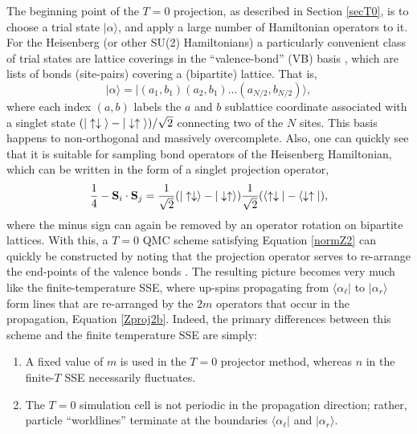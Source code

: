 \documentclass[vecphys]{svmult}
\begin{document}
The beginning point of the $T=0$ projection, as described in Section \ref{secT0}, is to choose a trial state $| \alpha \rangle$, and apply a large number of Hamiltonian operators to it.  
For the Heisenberg (or other SU(2) Hamiltonians) a particularly convenient class of trial states are lattice coverings in the ``valence-bond'' (VB) basis \cite{Melko:Liang88,Melko:Sandvik05,Melko:Beach06,Melko:AWSBeach}, which are lists of bonds (site-pairs) covering a (bipartite) lattice.  That is, 
\begin{equation}
| \alpha \rangle = | (a_1,b_1)(a_2,b_1) \ldots (a_{N/2}, b_{N/2})  \rangle,
\end{equation}
where each index $(a,b)$ labels the $a$ and $b$ sublattice coordinate associated with a singlet state $(|\uparrow \downarrow \hspace{1mm} \rangle  - | \downarrow \uparrow \hspace{1mm} \rangle)/\sqrt{2}$ connecting two of the $N$ sites.  This basis happens to non-orthogonal and massively overcomplete.  Also, one can quickly see that it is suitable for sampling bond operators of the Heisenberg Hamiltonian, which can be written in the form of a singlet projection operator,
\begin{equation}
\frac{1}{4} - {\bf  S}_i \cdot {\bf S}_j = \frac{1}{\sqrt{2}} (|\uparrow \downarrow \rangle  - |\downarrow \uparrow \rangle)
 \frac{1}{\sqrt{2}}  (\langle \uparrow \downarrow |  - \langle \downarrow \uparrow |),
\end{equation}
where the minus sign can again be removed by an operator rotation on bipartite lattices.
With this, a $T=0$ QMC scheme satisfying Equation \ref{normZ2} can quickly be constructed by noting that the projection operator serves to re-arrange the end-points of the valence bonds \cite{Melko:Sandvik05}.  The resulting picture becomes very much like the finite-temperature SSE, where up-spins propagating from $\langle \alpha_{\ell} |$ to $| \alpha_r \rangle$ form lines that are re-arranged by the $2m$ operators that occur in the propagation, Equation \ref{Zproj2b}.
Indeed, the primary differences between this scheme and the finite temperature SSE are simply:
\begin{enumerate}
\item A fixed value of $m$ is used in the $T=0$ projector method, whereas $n$ in the finite-$T$ SSE necessarily fluctuates.
\item The $T=0$ simulation cell is not periodic in the propagation direction; rather, particle ``worldlines'' terminate at the boundaries  $\langle \alpha_{\ell} |$ and $| \alpha_r \rangle$.
\end{enumerate}
\end{document}
